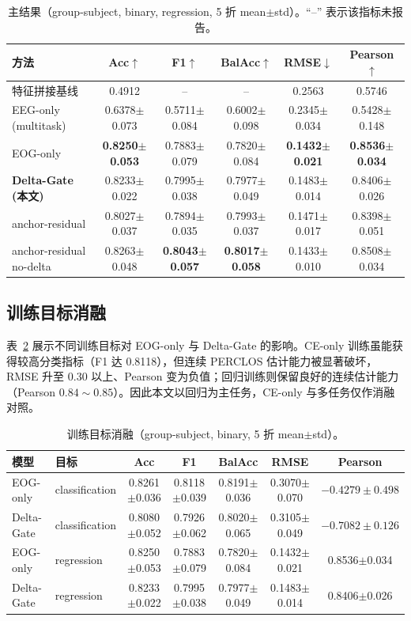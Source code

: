\documentclass[11pt,a4paper]{ctexart}
\begin{document}
\begin{table}[h]
\centering
\caption{主结果（group-subject, binary, regression, 5 折 mean$\pm$std）。``--'' 表示该指标未报告。}
\label{tab:main}
\small
\begin{tabular}{lccccc}
\toprule
方法 & Acc$\uparrow$ & F1$\uparrow$ & BalAcc$\uparrow$ & RMSE$\downarrow$ & Pearson$\uparrow$ \\
\midrule
特征拼接基线 & 0.4912 & -- & -- & 0.2563 & 0.5746 \\
EEG-only (multitask) & 0.6378$\pm$0.073 & 0.5711$\pm$0.084 & 0.6002$\pm$0.098 & 0.2345$\pm$0.034 & 0.5428$\pm$0.148 \\
EOG-only & \textbf{0.8250$\pm$0.053} & 0.7883$\pm$0.079 & 0.7820$\pm$0.084 & \textbf{0.1432$\pm$0.021} & \textbf{0.8536$\pm$0.034} \\
\textbf{Delta-Gate (本文)} & 0.8233$\pm$0.022 & 0.7995$\pm$0.038 & 0.7977$\pm$0.049 & 0.1483$\pm$0.014 & 0.8406$\pm$0.026 \\
anchor-residual & 0.8027$\pm$0.037 & 0.7894$\pm$0.035 & 0.7993$\pm$0.037 & 0.1471$\pm$0.017 & 0.8398$\pm$0.051 \\
anchor-residual no-delta & 0.8263$\pm$0.048 & \textbf{0.8043$\pm$0.057} & \textbf{0.8017$\pm$0.058} & 0.1433$\pm$0.010 & 0.8508$\pm$0.034 \\
\bottomrule
\end{tabular}
\end{table}

\subsection{训练目标消融}
表~\ref{tab:obj} 展示不同训练目标对 EOG-only 与 Delta-Gate 的影响。CE-only 训练虽能获得较高分类指标（F1 达 0.8118），但连续 PERCLOS 估计能力被显著破坏，RMSE 升至 0.30 以上、Pearson 变为负值；回归训练则保留良好的连续估计能力（Pearson $0.84\!\sim\!0.85$）。因此本文以回归为主任务，CE-only 与多任务仅作消融对照。

\begin{table}[h]
\centering
\caption{训练目标消融（group-subject, binary, 5 折 mean$\pm$std）。}
\label{tab:obj}
\small
\begin{tabular}{llccccc}
\toprule
模型 & 目标 & Acc & F1 & BalAcc & RMSE & Pearson \\
\midrule
EOG-only & classification & 0.8261$\pm$0.036 & 0.8118$\pm$0.039 & 0.8191$\pm$0.036 & 0.3070$\pm$0.070 & $-0.4279\pm0.498$ \\
Delta-Gate & classification & 0.8080$\pm$0.052 & 0.7926$\pm$0.062 & 0.8020$\pm$0.065 & 0.3105$\pm$0.049 & $-0.7082\pm0.126$ \\
EOG-only & regression & 0.8250$\pm$0.053 & 0.7883$\pm$0.079 & 0.7820$\pm$0.084 & 0.1432$\pm$0.021 & 0.8536$\pm$0.034 \\
Delta-Gate & regression & 0.8233$\pm$0.022 & 0.7995$\pm$0.038 & 0.7977$\pm$0.049 & 0.1483$\pm$0.014 & 0.8406$\pm$0.026 \\
\bottomrule
\end{tabular}
\end{table}
\end{document}
